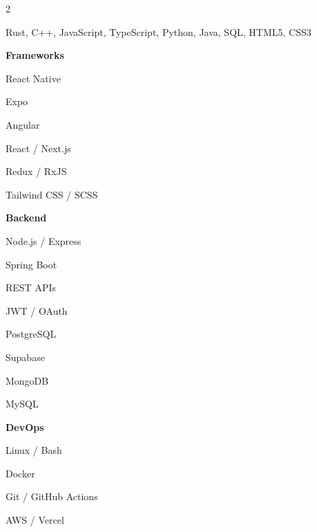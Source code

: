 \documentclass[10pt,a4paper]{article}
\begin{document}
\begin{paracol}{2}
\textbf{\color{accent}
}

Rust, C++, JavaScript, TypeScript, Python, Java, SQL, HTML5, CSS3

\vspace{1em}

\begin{minipage}[t]{0.48\linewidth}

\textbf{\color{accent}Frameworks}

React Native

Expo

Angular

React / Next.js

Redux / RxJS

Tailwind CSS / SCSS

\end{minipage}
\hfill
\begin{minipage}[t]{0.48\linewidth}

\textbf{\color{accent}Backend}

Node.js / Express

Spring Boot

REST APIs

JWT / OAuth

\end{minipage}

\vspace{1em}

\begin{minipage}[t]{0.48\linewidth}

\textbf{\color{accent}}

PostgreSQL

Supabase

MongoDB

MySQL

\end{minipage}
\hfill
\begin{minipage}[t]{0.48\linewidth}

\textbf{\color{accent}DevOps}

Linux / Bash

Docker

Git / GitHub Actions

AWS / Vercel

\end{minipage}
\section*{}


\end{paracol}
\end{document}
